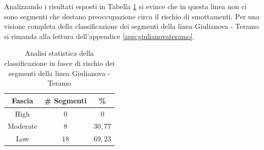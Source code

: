 \newline
Analizzando i risultati esposti in Tabella \ref{percentualegiulianovateramo} si evince che in questa linea non ci sono segmenti che destano preoccupazione circa il rischio di smottamenti. 
Per una visione completa della classificazione dei segmenti della linea Giulianova - Teramo si rimanda alla lettura dell'appendice \ref{app:giulianovateramo}.
\begin{table}[h]
\centering
\begin{tabular}{|c|c|c|}
\hline \rowcolor{lightgray}
Fascia   & \# Segmenti & \%    \\ \hline \rowcolor{flamingopink}
High     & $0$           & $0$     \\ \hline \rowcolor{icterine}
Moderate & $8$          & $30,77$ \\ \hline \rowcolor{inchworm}
Low      & $18$          & $69,23$ \\ \hline
\end{tabular}
\caption{Analisi statistica della classificazione in fasce di rischio dei segmenti della linea Giulianova - Teramo}
\label{percentualegiulianovateramo}
\end{table}
\newpage
